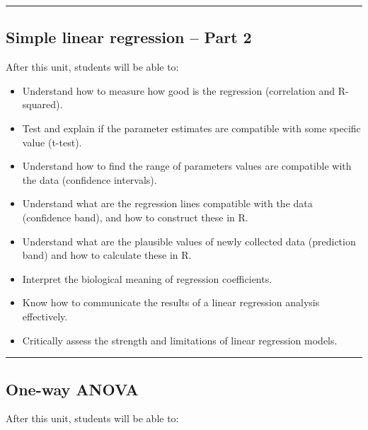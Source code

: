 \documentclass[
  letterpaper,
  8pt,
  a4paper]{book}
\providecommand{\tightlist}{%
  \setlength{\itemsep}{0pt}\setlength{\parskip}{0pt}}
\begin{document}
\begin{center}\rule{0.5\linewidth}{0.5pt}\end{center}

\subsection*{Simple linear regression -- Part
2}\label{simple-linear-regression-part-2}

After this unit, students will be able to:

\begin{itemize}
\tightlist
\item
  Understand how to measure how good is the regression (correlation and
  R-squared).
\item
  Test and explain if the parameter estimates are compatible with some
  specific value (t-test).
\item
  Understand how to find the range of parameters values are compatible
  with the data (confidence intervals).
\item
  Understand what are the regression lines compatible with the data
  (confidence band), and how to construct these in R.
\item
  Understand what are the plausible values of newly collected data
  (prediction band) and how to calculate these in R.
\item
  Interpret the biological meaning of regression coefficients.
\item
  Know how to communicate the results of a linear regression analysis
  effectively.
\item
  Critically assess the strength and limitations of linear regression
  models.
\end{itemize}

\begin{center}\rule{0.5\linewidth}{0.5pt}\end{center}

\subsection*{One-way ANOVA}\label{one-way-anova}

After this unit, students will be able to:
\end{document}
